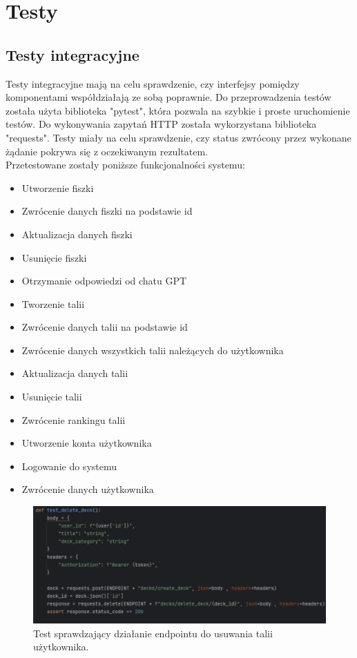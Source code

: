 \chapter{Testy}

\section{Testy integracyjne}

Testy integracyjne mają na celu sprawdzenie, czy interfejsy pomiędzy komponentami współdziałają ze sobą poprawnie.\cite{mielnikIntegrationTests} Do przeprowadzenia testów została użyta biblioteka "pytest", która pozwala na szybkie i proste uruchomienie testów.\cite{oliveira2018} Do wykonywania zapytań HTTP została wykorzystana biblioteka "requests". Testy miały na celu sprawdzenie, czy status zwrócony przez wykonane żądanie pokrywa się z oczekiwanym rezultatem.\\
Przetestowane zostały poniższe funkcjonalności systemu:

\begin{itemize}
    \item Utworzenie fiszki
    \item Zwrócenie danych fiszki na podstawie id
    \item Aktualizacja danych fiszki
    \item Usunięcie fiszki
    \item Otrzymanie odpowiedzi od chatu GPT
    \item Tworzenie talii
    \item Zwrócenie danych talii na podstawie id
    \item Zwrócenie danych wszystkich talii należących do użytkownika
    \item Aktualizacja danych talii
    \item Usunięcie talii
    \item Zwrócenie rankingu talii
    \item Utworzenie konta użytkownika
    \item Logowanie do systemu
    \item Zwrócenie danych użytkownika
\end{itemize}

\begin{figure}[H]
    \centering
    \includegraphics[width=1\textwidth]{chapters/chapter_9/testy1}
    \caption{Test sprawdzający działanie endpointu do usuwania talii użytkownika.}
    \label{img:testy}
\end{figure}

